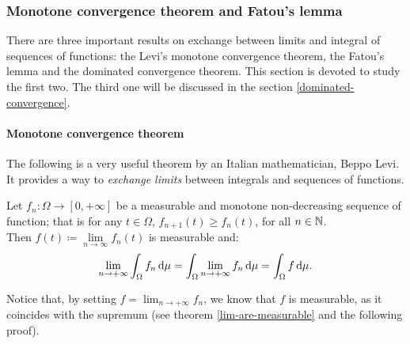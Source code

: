 \subsubsection{Monotone convergence theorem and Fatou's lemma}
There are three important results on exchange between limits and integral of sequences of functions: the Levi's monotone convergence theorem, the Fatou's lemma and the dominated convergence theorem.
This section is devoted to study the first two. The third one will be discussed in the section \vref{dominated-convergence}.

\paragraph{Monotone convergence theorem} The following is a very useful theorem by an Italian mathematician, Beppo Levi. It provides a way to \textit{exchange limits} between integrals and sequences of functions. 

\begin{theo} \label{monotone-convergence}
	Let $f_n:\Omega \to [0,+\infty]$ be a measurable and monotone non-decreasing sequence of function; that is for any $t \in \Omega$, $f_{n+1}(t) \ge f_n(t)$, for all $n \in \mathbb N$.\\
	Then $f(t) \coloneqq \lim\limits_{n\to\infty} f_n(t)$ is measurable and:
	$$
		\lim\limits_{n \to +\infty} \int_\Omega f_n \, \mathrm d\mu 
		= \int_\Omega \lim\limits_{n \to +\infty} f_n \, \mathrm d\mu 
		= \int_\Omega f \, \mathrm d \mu
	.
	$$
\end{theo}
Notice that, by setting $f = \lim_{n \to +\infty} f_n$, we know that $f$ is
measurable, as it coincides with the supremum (see theorem \vref{lim-are-measurable} and the following proof).


